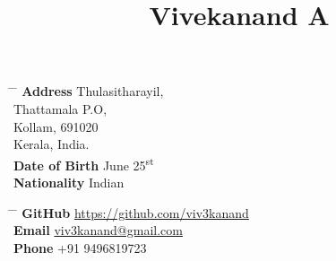 \documentclass[a4paper, 10pt]{article}
\date{\vspace{-10ex}}
\begin{document}
\title{\vspace{-12ex}Vivekanand A}

\maketitle

\parbox[t]{0.5\textwidth}{
\begin{tabbing}
\hspace{3cm} \= \hspace{4cm} \= \kill
{\bf Address} \> Thulasitharayil, \\
\> Thattamala P.O, \\
\> Kollam, 691020\\
\> Kerala, India. \\
{\bf Date of Birth}  June 25\textsuperscript{st} \\
{\bf Nationality} \> Indian \\
\end{tabbing}
}
\hfil
\parbox[t]{0.5\textwidth}{
\begin{tabbing}
\hspace{2cm} \= \hspace{4cm} \= \kill
{\bf GitHub} \> \href{https://github.com/viv3kanand}{https://github.com/viv3kanand} \\
{\bf Email} \> \href{mailto:viv3kanand@gmail.com}{viv3kanand@gmail.com} \\
{\bf Phone} \> +91 9496819723
\end{tabbing}
}


\end{document}
